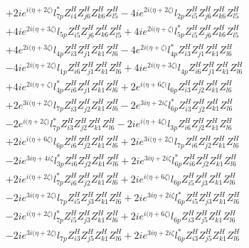 \begin{align}
 &+2 i e^{i \Big(\eta +2 \zeta \Big)} l_{7p}^* Z_{{i 4}}^{H} Z_{{j 6}}^{H} Z_{{k 6}}^{H} Z_{{l 5}}^{H} -4 i e^{2 i \Big(\eta +2 \zeta \Big)} l_{2p} Z_{{i 5}}^{H} Z_{{j 6}}^{H} Z_{{k 6}}^{H} Z_{{l 5}}^{H} \nonumber \\ 
 &+4 i e^{2 i \Big(\eta +3 \zeta \Big)} l_{5p} Z_{{i 5}}^{H} Z_{{j 6}}^{H} Z_{{k 6}}^{H} Z_{{l 5}}^{H} +4 i e^{2 i \Big(\eta +\zeta \Big)} l_{5p}^* Z_{{i 5}}^{H} Z_{{j 6}}^{H} Z_{{k 6}}^{H} Z_{{l 5}}^{H} \nonumber \\ 
 &+4 e^{2 i \Big(\eta +3 \zeta \Big)} l_{4p} Z_{{i 3}}^{H} Z_{{j 1}}^{H} Z_{{k 1}}^{H} Z_{{l 6}}^{H} -4 e^{2 i \Big(\eta +\zeta \Big)} l_{4p}^* Z_{{i 3}}^{H} Z_{{j 1}}^{H} Z_{{k 1}}^{H} Z_{{l 6}}^{H} \nonumber \\ 
 &-4 i e^{2 i \Big(\eta +2 \zeta \Big)} l_{1p} Z_{{i 6}}^{H} Z_{{j 1}}^{H} Z_{{k 1}}^{H} Z_{{l 6}}^{H} +4 i e^{2 i \Big(\eta +3 \zeta \Big)} l_{4p} Z_{{i 6}}^{H} Z_{{j 1}}^{H} Z_{{k 1}}^{H} Z_{{l 6}}^{H} \nonumber \\ 
 &+4 i e^{2 i \Big(\eta +\zeta \Big)} l_{4p}^* Z_{{i 6}}^{H} Z_{{j 1}}^{H} Z_{{k 1}}^{H} Z_{{l 6}}^{H} +2 e^{i \Big(\eta +6 \zeta \Big)} l_{6p} Z_{{i 3}}^{H} Z_{{j 2}}^{H} Z_{{k 1}}^{H} Z_{{l 6}}^{H} \nonumber \\ 
 &+2 e^{3 i \Big(\eta +2 \zeta \Big)} l_{7p} Z_{{i 3}}^{H} Z_{{j 2}}^{H} Z_{{k 1}}^{H} Z_{{l 6}}^{H} -2 e^{3 i \eta +2 i \zeta } l_{6p}^* Z_{{i 3}}^{H} Z_{{j 2}}^{H} Z_{{k 1}}^{H} Z_{{l 6}}^{H} \nonumber \\ 
 &-2 e^{i \Big(\eta +2 \zeta \Big)} l_{7p}^* Z_{{i 3}}^{H} Z_{{j 2}}^{H} Z_{{k 1}}^{H} Z_{{l 6}}^{H} -2 i e^{i \Big(\eta +4 \zeta \Big)} l_{3p} Z_{{i 6}}^{H} Z_{{j 2}}^{H} Z_{{k 1}}^{H} Z_{{l 6}}^{H} \nonumber \\ 
 &+2 i e^{i \Big(\eta +6 \zeta \Big)} l_{6p} Z_{{i 6}}^{H} Z_{{j 2}}^{H} Z_{{k 1}}^{H} Z_{{l 6}}^{H} +2 i e^{3 i \Big(\eta +2 \zeta \Big)} l_{7p} Z_{{i 6}}^{H} Z_{{j 2}}^{H} Z_{{k 1}}^{H} Z_{{l 6}}^{H} \nonumber \\ 
 &-2 i e^{3 i \eta +4 i \zeta } l_{3p}^* Z_{{i 6}}^{H} Z_{{j 2}}^{H} Z_{{k 1}}^{H} Z_{{l 6}}^{H} +2 i e^{3 i \eta +2 i \zeta } l_{6p}^* Z_{{i 6}}^{H} Z_{{j 2}}^{H} Z_{{k 1}}^{H} Z_{{l 6}}^{H} \nonumber \\ 
 &+2 i e^{i \Big(\eta +2 \zeta \Big)} l_{7p}^* Z_{{i 6}}^{H} Z_{{j 2}}^{H} Z_{{k 1}}^{H} Z_{{l 6}}^{H} +2 i e^{i \Big(\eta +6 \zeta \Big)} l_{6p} Z_{{i 5}}^{H} Z_{{j 3}}^{H} Z_{{k 1}}^{H} Z_{{l 6}}^{H} \nonumber \\ 
 &-2 i e^{3 i \Big(\eta +2 \zeta \Big)} l_{7p} Z_{{i 5}}^{H} Z_{{j 3}}^{H} Z_{{k 1}}^{H} Z_{{l 6}}^{H} +2 i e^{3 i \eta +2 i \zeta } l_{6p}^* Z_{{i 5}}^{H} Z_{{j 3}}^{H} Z_{{k 1}}^{H} Z_{{l 6}}^{H} \nonumber \\ 
 &-2 i e^{i \Big(\eta +2 \zeta \Big)} l_{7p}^* Z_{{i 5}}^{H} Z_{{j 3}}^{H} Z_{{k 1}}^{H} Z_{{l 6}}^{H} +2 i e^{i \Big(\eta +6 \zeta \Big)} l_{6p} Z_{{i 3}}^{H} Z_{{j 5}}^{H} Z_{{k 1}}^{H} Z_{{l 6}}^{H} \nonumber \\ 
 &-2 i e^{3 i \Big(\eta +2 \zeta \Big)} l_{7p} Z_{{i 3}}^{H} Z_{{j 5}}^{H} Z_{{k 1}}^{H} Z_{{l 6}}^{H} +2 i e^{3 i \eta +2 i \zeta } l_{6p}^* Z_{{i 3}}^{H} Z_{{j 5}}^{H} Z_{{k 1}}^{H} Z_{{l 6}}^{H} \nonumber 
\end{align} 

